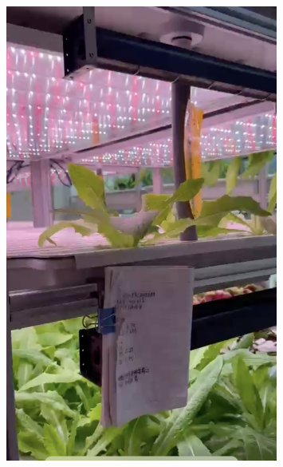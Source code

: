 \begin{figure}[H]
	\centering
	\includegraphics[width=0.8\textwidth]{media/ekon2/image49}
	\caption*{}
\end{figure}

